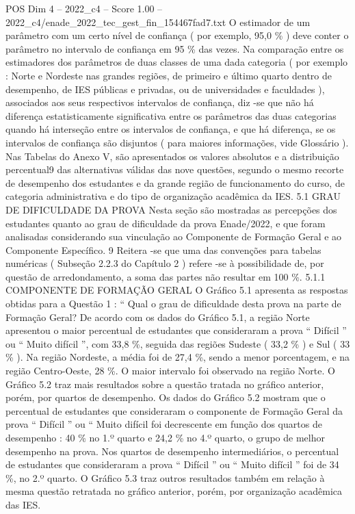 \begin{textsample}{POS Dim 4 – 2022\_c4 – Score 1.00 – 2022\_c4/enade\_2022\_tec\_gest\_fin\_154467fad7.txt}
O estimador de um parâmetro com um certo nível de confiança ( por exemplo, 95,0 \% ) deve conter o parâmetro no intervalo de confiança em 95 \% das vezes.
Na comparação entre os estimadores dos parâmetros de duas classes de uma dada categoria ( por exemplo : Norte e Nordeste nas grandes regiões, de primeiro e último quarto dentro de desempenho, de IES públicas e privadas, ou de universidades e faculdades ), associados aos seus respectivos intervalos de confiança, diz -se que não há diferença estatisticamente significativa entre os parâmetros das duas categorias quando há interseção entre os intervalos de confiança, e que há diferença, se os intervalos de confiança são disjuntos ( para maiores informações, vide Glossário ).
Nas Tabelas do Anexo V, são apresentados os valores absolutos e a distribuição percentual9 das alternativas válidas das nove questões, segundo o mesmo recorte de desempenho dos estudantes e da grande região de funcionamento do curso, de categoria administrativa e do tipo de organização acadêmica da IES. 5.1 GRAU DE DIFICULDADE DA PROVA Nesta seção são mostradas as percepções dos estudantes quanto ao grau de dificuldade da prova Enade/2022, e que foram analisadas considerando sua vinculação ao Componente de Formação Geral e ao Componente Específico. 9 Reitera -se que uma das convenções para tabelas numéricas ( Subseção 2.2.3 do Capítulo 2 ) refere -se à possibilidade de, por questão de arredondamento, a soma das partes não resultar em 100 \%. 5.1.1 COMPONENTE DE FORMAÇÃO GERAL O Gráfico 5.1 apresenta as respostas obtidas para a Questão 1 : “ Qual o grau de dificuldade desta prova na parte de Formação Geral?
De acordo com os dados do Gráfico 5.1, a região Norte apresentou o maior percentual de estudantes que consideraram a prova “ Difícil ” ou “ Muito difícil ”, com 33,8 \%, seguida das regiões Sudeste ( 33,2 \% ) e Sul ( 33 \% ).
Na região Nordeste, a média foi de 27,4 \%, sendo a menor porcentagem, e na região Centro-Oeste, 28 \%.
O maior intervalo foi observado na região Norte.
O Gráfico 5.2 traz mais resultados sobre a questão tratada no gráfico anterior, porém, por quartos de desempenho.
Os dados do Gráfico 5.2 mostram que o percentual de estudantes que consideraram o componente de Formação Geral da prova “ Difícil ” ou “ Muito difícil foi decrescente em função dos quartos de desempenho : 40 \% no 1.º quarto e 24,2 \% no 4.º quarto, o grupo de melhor desempenho na prova.
Nos quartos de desempenho intermediários, o percentual de estudantes que consideraram a prova “ Difícil ” ou “ Muito difícil ” foi de 34 \%, no 2.º quarto.
O Gráfico 5.3 traz outros resultados também em relação à mesma questão retratada no gráfico anterior, porém, por organização acadêmica das IES.

\end{textsample}
